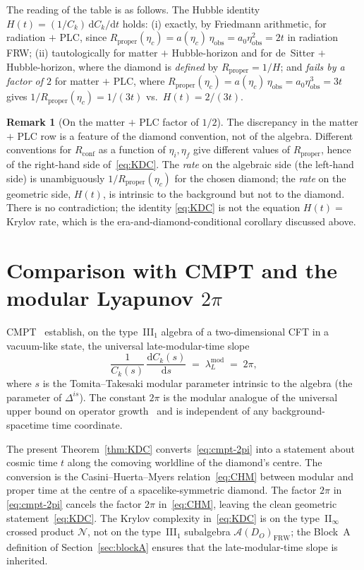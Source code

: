 \documentclass[11pt]{article}
\theoremstyle{definition}
\newtheorem{remark}[theorem]{Remark}
\renewcommand{\AA}{\mathcal{A}}
\newcommand{\NN}{\mathcal{N}}
\newcommand{\FRW}{\mathrm{FRW}}
\newcommand{\Rprop}{R_{\mathrm{proper}}}
\newcommand{\Rconf}{R_{\mathrm{conf}}}
\begin{document}
\medskip

\noindent The reading of the table is as follows. The Hubble identity
$H(t) = (1/C_k)\,\mathrm{d}C_k/\mathrm{d}t$ holds:
(i) exactly, by Friedmann arithmetic, for radiation $+$ PLC, since
\(\Rprop(\eta_c) = a(\eta_c)\,\eta_{\mathrm{obs}} = a_0\eta_{\mathrm{obs}}^2 = 2t\)
in radiation FRW;
(ii) tautologically for matter $+$ Hubble-horizon and for
de~Sitter $+$ Hubble-horizon, where the diamond is \emph{defined} by
$\Rprop = 1/H$;
and \emph{fails by a factor of $2$} for matter $+$ PLC, where
\(\Rprop(\eta_c) = a(\eta_c)\,\eta_{\mathrm{obs}} = a_0\eta_{\mathrm{obs}}^3 = 3t\)
gives $1/\Rprop(\eta_c) = 1/(3t)$ vs.\ $H(t) = 2/(3t)$.

\begin{remark}[On the matter $+$ PLC factor of $1/2$]\label{rem:matter-half}
The discrepancy in the matter $+$ PLC row is a feature of the
diamond convention, not of the algebra. Different conventions for
$\Rconf$ as a function of $\eta_i, \eta_f$ give different values of
$\Rprop$, hence of the right-hand side of~\eqref{eq:KDC}. The
\emph{rate} on the algebraic side (the left-hand side) is
unambiguously $1/\Rprop(\eta_c)$ for the chosen diamond; the
\emph{rate} on the geometric side, $H(t)$, is intrinsic to the
background but not to the diamond. There is no contradiction; the
identity \eqref{eq:KDC} is not the equation $H(t) = $ Krylov rate,
which is the era-and-diamond-conditional corollary discussed above.
\end{remark}

\section{Comparison with CMPT and the modular Lyapunov \texorpdfstring{$2\pi$}{2pi}}\label{sec:cmpt}

CMPT~\cite{CMPT24} establish, on the type~III$_1$ algebra of a
two-dimensional CFT in a vacuum-like state, the universal late-modular-time
slope
\begin{equation}\label{eq:cmpt-2pi}
\frac{1}{C_k(s)}\,\frac{\mathrm{d}C_k(s)}{\mathrm{d}s} \;=\; \lambda_L^{\mathrm{mod}} \;=\; 2\pi,
\end{equation}
where $s$ is the Tomita--Takesaki modular parameter intrinsic to the
algebra (the parameter of $\Delta^{is}$). The constant $2\pi$ is the
modular analogue of the universal upper bound on operator
growth~\cite{ParkerEtAl2019} and is independent of any
background-spacetime time coordinate.

The present Theorem~\ref{thm:KDC} converts~\eqref{eq:cmpt-2pi} into a
statement about cosmic time $t$ along the comoving worldline of the
diamond's centre. The conversion is the Casini--Huerta--Myers
relation~\eqref{eq:CHM} between modular and proper time at the
centre of a spacelike-symmetric diamond. The factor $2\pi$ in
\eqref{eq:cmpt-2pi} cancels the factor $2\pi$ in~\eqref{eq:CHM},
leaving the clean geometric statement~\eqref{eq:KDC}.
The Krylov complexity in~\eqref{eq:KDC} is on the type~II$_\infty$
crossed product $\NN$, not on the type~III$_1$ subalgebra
$\AA(D_O)_\FRW$; the Block~A definition of Section~\ref{sec:blockA}
ensures that the late-modular-time slope is inherited.
\end{document}
